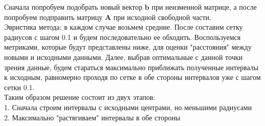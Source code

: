 \documentclass[../body.tex]{subfiles}
\begin{document}
Сначала попробуем подобрать новый вектор $\textbf{b}$ при неизменной матрице, а после попробуем подправить матрицу $\textbf{A}$ при исходной свободной части.
\\Эвристика метода: в каждом случае возьмем средние. После составим сетку радиусов с шагом 0.1 и будем последовательно ее обходить. Воспользуемся метриками, которые будут представлены ниже, для оценки "расстояния" между новыми и исходными данными. Далее, выбрав оптимальные с данной точки зрения данные, будем стараться максимально приближать полученные интервалы к исходным, равномерно проходя по сетке в обе стороны интервалов уже с шагом сетки 0.1.
\\Таким образом решение состоит из двух этапов:
\\1. Сначала строим интервалы с исходными центрами, но меньшими радиусами
\\2. Максимально "растягиваем" интервалы в обе стороны
\end{document}
